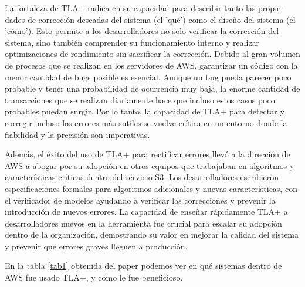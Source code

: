 \documentclass[runningheads]{llncs}
\begin{document}
La fortaleza de TLA+ radica en su capacidad para describir tanto las propie-\\dades de corrección deseadas del sistema (el 'qué') como el diseño del sistema (el 'cómo'). Esto permite a los desarrolladores no solo verificar la corrección del sistema, sino también comprender su funcionamiento interno y realizar optimizaciones de rendimiento sin sacrificar la corrección. Debido al gran volumen de procesos que se realizan en los servidores de AWS, garantizar un código con la menor cantidad de bugs posible es esencial. Aunque un bug pueda parecer poco probable y tener una probabilidad de ocurrencia muy baja, la enorme cantidad de transacciones que se realizan diariamente hace que incluso estos casos poco probables puedan surgir. Por lo tanto, la capacidad de TLA+ para detectar y corregir incluso los errores más sutiles se vuelve crítica en un entorno donde la fiabilidad y la precisión son imperativas.

Además, el éxito del uso de TLA+ para rectificar errores llevó a la dirección de AWS a abogar por su adopción en otros equipos que trabajaban en algoritmos y características críticas dentro del servicio S3. Los desarrolladores escribieron especificaciones formales para algoritmos adicionales y nuevas características, con el verificador de modelos ayudando a verificar las correcciones y prevenir la introducción de nuevos errores. La capacidad de enseñar rápidamente TLA+ a desarrolladores nuevos en la herramienta fue crucial para escalar su adopción dentro de la organización, demostrando su valor en mejorar la calidad del sistema y prevenir que errores graves lleguen a producción.

En la tabla \ref{tab1} obtenida del paper podemos ver en qué sistemas dentro de AWS fue usado TLA+, y cómo le fue beneficioso.
\end{document}
